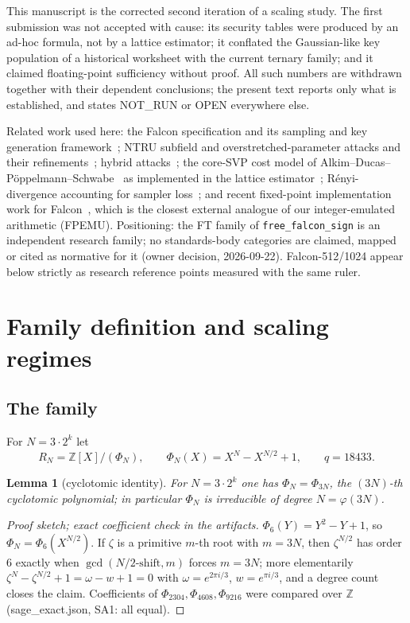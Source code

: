 \documentclass[11pt,a4paper]{article}
\newtheorem{lemma}{Lemma}
\theoremstyle{remark}
\newcommand{\NOTRUN}{\textsf{NOT\_RUN}}
\newcommand{\OPEN}{\textsf{OPEN}}
\begin{document}
This manuscript is the corrected second iteration of a scaling study. The
first submission was not accepted with cause: its security tables were
produced by an ad-hoc formula, not by a lattice estimator; it conflated the
Gaussian-like key population of a historical worksheet with the current
ternary family; and it claimed floating-point sufficiency without proof. All
such numbers are withdrawn together with their dependent conclusions; the
present text reports only what is established, and states \NOTRUN{} or
\OPEN{} everywhere else.

Related work used here: the Falcon specification and its sampling and key
generation framework~\cite{falcon-spec,porninprest19,howeprest20}; NTRU
subfield and overstretched-parameter attacks and their
refinements~\cite{abd16,kirfou17,ducwoe21}; hybrid
attacks~\cite{howgraham07,wunderer19}; the core-SVP cost model of
Alkim--Ducas--P\"oppelmann--Schwabe~\cite{adps16} as implemented in the
lattice estimator~\cite{estimator,aps15}; R\'enyi-divergence accounting for
sampler loss~\cite{prest17renyi,prest15thesis}; and recent fixed-point
implementation work for Falcon~\cite{prest-fixedpoint26}, which is the
closest external analogue of our integer-emulated arithmetic (FPEMU).
Positioning: the FT family of \texttt{free\_falcon\_sign} is an independent
research family; no standards-body categories are claimed, mapped or cited
as normative for it (owner decision, 2026-09-22). Falcon-512/1024 appear
below strictly as research reference points measured with the same ruler.

\section{Family definition and scaling regimes}
\label{sec:family}

\subsection{The family}
For $N=3\cdot 2^{k}$ let
\[
  R_N=\mathbb Z[X]/(\Phi_N),\qquad \Phi_N(X)=X^N-X^{N/2}+1,\qquad q=18433 .
\]

\begin{lemma}[cyclotomic identity]\label{lem:cyclo}
For $N=3\cdot 2^{k}$ one has $\Phi_N=\Phi_{3N}$, the $(3N)$-th cyclotomic
polynomial; in particular $\Phi_N$ is irreducible of degree $N=\varphi(3N)$.
\end{lemma}

\begin{proof}[Proof sketch; exact coefficient check in the artifacts]
$\Phi_6(Y)=Y^2-Y+1$, so $\Phi_N=\Phi_6(X^{N/2})$. If $\zeta$ is a primitive
$m$-th root with $m=3N$, then $\zeta^{N/2}$ has order $6$ exactly when
$\gcd(N/2\text{-shift},m)$ forces $m=3N$; more elementarily
$\zeta^{N}-\zeta^{N/2}+1=\omega-w+1=0$ with $\omega=e^{2\pi i/3}$,
$w=e^{\pi i/3}$, and a degree count closes the claim. Coefficients of
$\Phi_{2304},\Phi_{4608},\Phi_{9216}$ were compared over $\mathbb Z$
(\textsf{sage\_exact.json}, SA1: all equal).
\end{proof}
\end{document}
